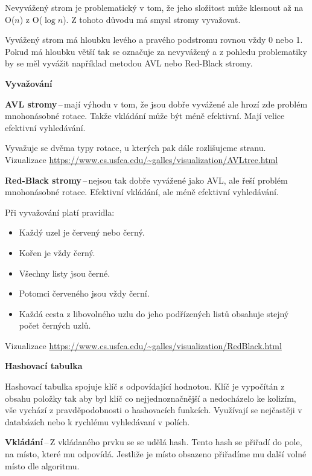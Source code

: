 Nevyvážený strom je problematický v tom, že jeho složitost může klesnout až na O($n$) z O($\log{n}$). Z tohoto důvodu má smysl stromy vyvažovat.

Vyvážený strom má hloubku levého a pravého podstromu rovnou vždy 0 nebo 1. Pokud má hloubku větší tak se označuje za nevyvážený a z pohledu problematiky by se měl vyvážit například metodou AVL nebo Red-Black stromy.

\begin{Large}\vspace{0,5cm} \textbf{Vyvažování}
\end{Large}

\textbf{AVL stromy}\,--\,mají výhodu v tom, že jsou dobře vyvážené ale hrozí zde problém mnohonásobné rotace. Takže vkládání může být méně efektivní. Mají velice efektivní vyhledávání.

Vyvažuje se dvěma typy rotace, u kterých pak dále rozlišujeme stranu. Vizualizace \url{https://www.cs.usfca.edu/~galles/visualization/AVLtree.html}

\textbf{Red-Black stromy}\,--\,nejsou tak dobře vyvážené jako AVL, ale řeší problém mnohonásobné rotace. Efektivní vkládání, ale méně efektivní vyhledávání.

Při vyvažování platí pravidla:
\begin{itemize}
    \item Každý uzel je červený nebo černý.
    \item Kořen je vždy černý.
    \item Všechny listy jsou černé.
    \item Potomci červeného jsou vždy černí.
    \item Každá cesta z libovolného uzlu do jeho podřízených listů obsahuje stejný počet černých uzlů.
\end{itemize}
Vizualizace \url{https://www.cs.usfca.edu/~galles/visualization/RedBlack.html}


\begin{Large}\vspace{0,5cm} \textbf{Hashovací tabulka}
\end{Large}

Hashovací tabulka spojuje klíč s odpovídající hodnotou. Klíč je vypočítán z obsahu položky tak aby byl klíč co nejjednoznačnější a nedocházelo ke kolizím, vše vychází z pravděpodobnosti o hashovacích funkcích. Využívají se nejčastěji v databázích nebo k rychlému vyhledávaní v polích.

\textbf{Vkládání}\,--\,Z vkládaného prvku se se udělá hash. Tento hash se přiřadí do pole, na místo, které mu odpovídá. Jestliže je místo obsazeno přiřadíme mu další volné místo dle algoritmu.

